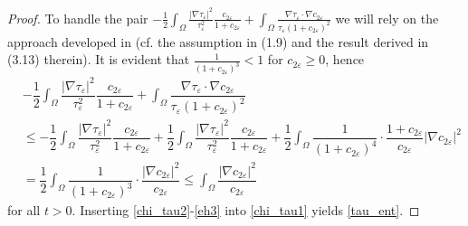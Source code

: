 \documentclass[a4paper,10pt]{article}
\theoremstyle{definition}
\begin{document}
\begin{proof}
   To handle the pair $- \frac{1}{2} \int_\Omega \frac{|\nabla \tau_\varepsilon|^2}{\tau_\varepsilon^2} \frac{c_{2\varepsilon}}{1 + c_{2\varepsilon}} + \int_\Omega \frac{\nabla \tau_\varepsilon \cdot \nabla c_{2\varepsilon}}{\tau_\varepsilon (1 + c_{2\varepsilon})^2} $ we will rely on the approach developed in \cite{surulescu2021does} (cf. the assumption in (1.9) and the result derived in (3.13) therein). It is evident that $\frac{1}{(1 + c_{2\varepsilon})^3} < 1$ for $c_{2\varepsilon} \geq 0$, hence
  \begin{align}
  \label{eh3}
   \nonumber & - \dfrac{1}{2} \int_\Omega \dfrac{|\nabla \tau_\varepsilon|^2}{\tau_\varepsilon^2} \dfrac{c_{2\varepsilon}}{1 + c_{2\varepsilon}} + \int_\Omega \dfrac{\nabla \tau_\varepsilon \cdot \nabla c_{2\varepsilon}}{\tau_\varepsilon (1 + c_{2\varepsilon})^2}\\[5pt]
    & \nonumber \leq - \dfrac{1}{2} \int_\Omega \dfrac{|\nabla \tau_\varepsilon|^2}{\tau_\varepsilon^2} \dfrac{c_{2\varepsilon}}{1 + c_{2\varepsilon}} + \dfrac{1}{2} \int_\Omega \dfrac{|\nabla \tau_\varepsilon|^2}{\tau_\varepsilon^2} \dfrac{c_{2\varepsilon}}{1 + c_{2\varepsilon}} + \dfrac{1}{2} \int_\Omega\dfrac{1}{(1 + c_{2\varepsilon})^4} \cdot \dfrac{1 + c_{2\varepsilon}}{c_{2\varepsilon}} |\nabla c_{2\varepsilon}|^2                                              \\[5pt]
  &= \dfrac{1}{2} \int_\Omega\dfrac{1}{(1 + c_{2\varepsilon})^3} \cdot \dfrac{|\nabla c_{2\varepsilon}|^2}{c_{2\varepsilon}} \leq  \int_\Omega \dfrac{|\nabla c_{2\varepsilon}|^2}{c_{2\varepsilon}}
  \end{align}
for all $t > 0$. Inserting \eqref{chi_tau2}-\eqref{eh3} into \eqref{chi_tau1} yields \eqref{tau_ent}.
\end{proof}
\end{document}
